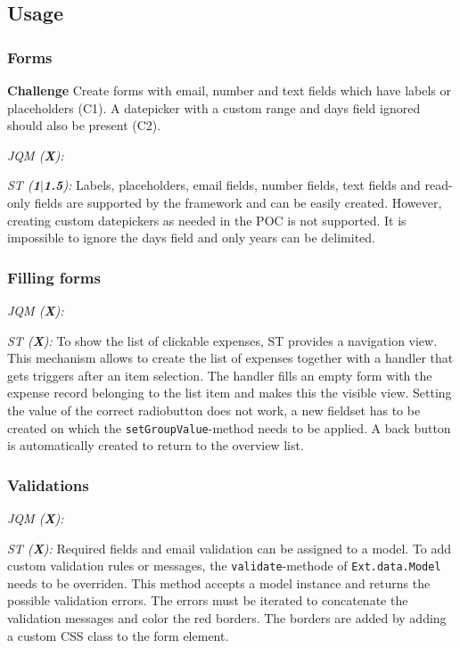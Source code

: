 \documentclass[a4paper]{artikel3}
\newcommand{\code}[1]{\texttt{#1}}
\newcommand{\framework}[2]{\emph{\MakeUppercase{#1} (\textbf{#2}): }} %
\begin{document}
\subsection{Usage} %
\label{sec:poc}

\subsubsection{Forms}
\textbf{Challenge} Create forms with email, number and text fields which have labels or placeholders (C1).  A datepicker with a custom range and days field ignored should also be present (C2).

\framework{jQM}{X}

\framework{ST}{1$|$1.5}
Labels,  placeholders,  email fields, number fields, text fields and read-only fields are supported by the framework and can be easily created.  However, creating custom datepickers as needed in the POC is not supported.  It is impossible to ignore the days field and only years can be delimited.  

\subsubsection{Filling forms} %
\framework{jQM}{X}

\framework{ST}{X}
To show the list of clickable expenses,  ST provides a navigation view.  This mechanism allows to create the list of expenses together with a handler that gets triggers after an item selection.  The handler fills an empty form with the expense record belonging to the list item and makes this the visible view.  Setting the value of the correct radiobutton does not work,  a new fieldset has to be created on which the \code{setGroupValue}-method needs to be applied.  A back button is automatically created to return to the overview list.


\subsubsection{Validations} %
\framework{jQM}{X}

\framework{ST}{X}
Required fields and email validation can be assigned to a model.  To add custom validation rules or messages,  the \code{validate}-methode of \code{Ext.data.Model} needs to be overriden.  This method accepts a model instance and returns the possible validation errors.  The errors must be iterated to concatenate the validation messages and color the red borders.  The borders are added by adding a custom CSS class to the form element.
\end{document}
